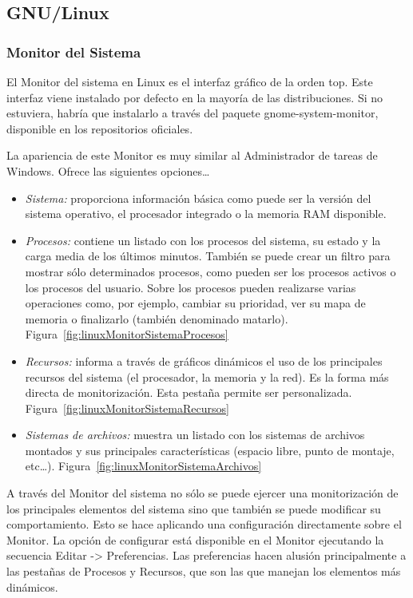 \documentclass[a4paper,11pt]{article}
\begin{document}
\subsection{GNU/Linux}

\subsubsection{Monitor del Sistema}

 \cite{ref:web5} El Monitor del sistema en Linux es el interfaz gráfico de la orden top. Este interfaz viene instalado por defecto en la mayoría de las distribuciones. Si no estuviera, habría que instalarlo a través del paquete gnome-system-monitor, disponible en los repositorios oficiales.

La apariencia de este Monitor es muy similar al Administrador de tareas de Windows. Ofrece las siguientes opciones…

\begin{itemize}
  \item \textit{Sistema:} proporciona información básica como puede ser la versión del sistema operativo, el procesador integrado o la memoria RAM disponible.
  \item \textit{Procesos:} contiene un listado con los procesos del sistema, su estado y la carga media de los últimos minutos. También se puede crear un filtro para mostrar sólo determinados procesos, como pueden ser los procesos activos o los procesos del usuario. Sobre los procesos pueden realizarse varias operaciones como, por ejemplo, cambiar su prioridad, ver su mapa de memoria o finalizarlo (también denominado matarlo). Figura~\ref{fig:linuxMonitorSistemaProcesos}
  \item \textit{Recursos:} informa a través de gráficos dinámicos el uso de los principales recursos del sistema (el procesador, la memoria y la red). Es la forma más directa de monitorización. Esta pestaña permite ser personalizada. Figura~\ref{fig:linuxMonitorSistemaRecursos}
  \item \textit{Sistemas de archivos:} muestra un listado con los sistemas de archivos montados y sus principales características (espacio libre, punto de montaje, etc…). Figura~\ref{fig:linuxMonitorSistemaArchivos}
\end{itemize}

A través del Monitor del sistema no sólo se puede ejercer una monitorización de los principales elementos del sistema sino que también se puede modificar su comportamiento. Esto se hace aplicando una configuración directamente sobre el Monitor. La opción de configurar está disponible en el Monitor ejecutando la secuencia Editar -> Preferencias. Las preferencias hacen alusión principalmente a las pestañas de Procesos y Recursos, que son las que manejan los elementos más dinámicos.
\end{document}

